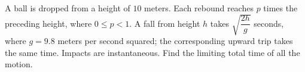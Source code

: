 A ball is dropped from a height of $10$ meters. Each rebound reaches $p$ times the preceding height, where $0\le p<1$. A fall from height $h$ takes $\sqrt{\dfrac{2h}{g}}$ seconds, where $g=9.8$ meters per second squared; the corresponding upward trip takes the same time. Impacts are instantaneous. Find the limiting total time of all the motion.
